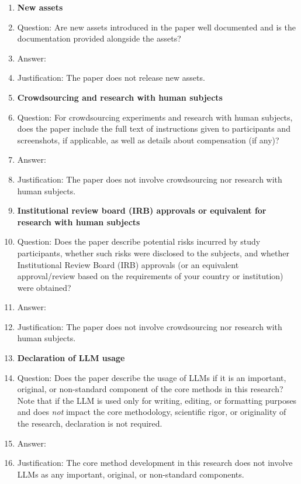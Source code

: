 \begin{enumerate}
	
	\item {\bf New assets}
	\item[] Question: Are new assets introduced in the paper well documented and is the documentation provided alongside the assets?
	\item[] Answer: \answerNA{} %
	\item[] Justification: The paper does not release new assets.
	
	
	\item {\bf Crowdsourcing and research with human subjects}
	\item[] Question: For crowdsourcing experiments and research with human subjects, does the paper include the full text of instructions given to participants and screenshots, if applicable, as well as details about compensation (if any)? 
	\item[] Answer: \answerNA{} %
	\item[] Justification: The paper does not involve crowdsourcing nor research with human subjects.

	
	\item {\bf Institutional review board (IRB) approvals or equivalent for research with human subjects}
	\item[] Question: Does the paper describe potential risks incurred by study participants, whether such risks were disclosed to the subjects, and whether Institutional Review Board (IRB) approvals (or an equivalent approval/review based on the requirements of your country or institution) were obtained?
	\item[] Answer: \answerNA{} %
	\item[] Justification: The paper does not involve crowdsourcing nor research with human subjects.
	
	
	\item {\bf Declaration of LLM usage}
	\item[] Question: Does the paper describe the usage of LLMs if it is an important, original, or non-standard component of the core methods in this research? Note that if the LLM is used only for writing, editing, or formatting purposes and does \emph{not} impact the core methodology, scientific rigor, or originality of the research, declaration is not required.
	\item[] Answer: \answerNA{} %
	\item[] Justification: The core method development in this research does not involve LLMs as any important, original, or non-standard components.
\end{enumerate}



